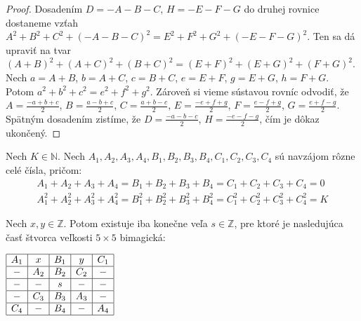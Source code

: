 \begin{proof} Dosadením $D = -A-B-C$, $H = -E-F-G$ do druhej rovnice dostaneme vzťah $A^2 + B^2 + C^2 + (-A-B-C)^2 = E^2 + F^2 + G^2 + (-E-F-G)^2$. Ten sa dá upraviť na tvar $(A+B)^2 + (A+C)^2 + (B+C)^2 = (E+F)^2 + (E+G)^2 + (F+G)^2$. Nech $a = A+B$, $b = A+C$, $c = B+C$, $e = E+F$, $g = E+G$, $h = F+G$. Potom $a^2 + b^2 + c^2 = e^2 + f^2 + g^2$. Zároveň si vieme sústavou rovníc odvodiť, že $A = \frac{-a+b+c}{2}$, $B = \frac{a-b+c}{2}$, $C = \frac{a+b-c}{2}$, $E = \frac{-e+f+g}{2}$, $F = \frac{e-f+g}{2}$, $G = \frac{e+f-g}{2}$. Spätným dosadením zistíme, že $D = \frac{-a-b-c}{2}$, $H = \frac{-e-f-g}{2}$, čím je dôkaz ukončený.
\end{proof}

\begin{theorem}
\label{5x5bimagic3}
Nech $K \in \mathbb{N}$. Nech $A_1, A_2, A_3, A_4, B_1, B_2, B_3, B_4, C_1, C_2, C_3, C_4$ sú navzájom rôzne celé čísla, pričom:
\begin{gather*}
A_1 + A_2 + A_3 + A_4 = B_1 + B_2 + B_3 + B_4 = C_1 + C_2 + C_3 + C_4 = 0 \\
A_1^2 + A_2^2 + A_3^2 + A_4^2 = B_1^2 + B_2^2 + B_3^2 + B_4^2 = C_1^2 + C_2^2 + C_3^2 + C_4^2 = K
\end{gather*}

Nech $x,y \in \mathbb{Z}$. Potom existuje iba konečne veľa $s \in \mathbb{Z}$, pre ktoré je nasledujúca časť štvorca veľkosti $5 \times 5$ bimagická: 

\begin{center}
$\begin{array}{ |c|c|c|c|c| }
\hline
A_1 & x & B_1 & y & C_1 \\ 
\hline
- & A_2 & B_2 & C_2 & -  \\ 
\hline
- & - & s & - & - \\ 
\hline
- & C_3 & B_3 & A_3 & - \\ 
\hline
C_4 & - & B_4 & - & A_4 \\ 
\hline
\end{array}$
\end{center}

\end{theorem}

